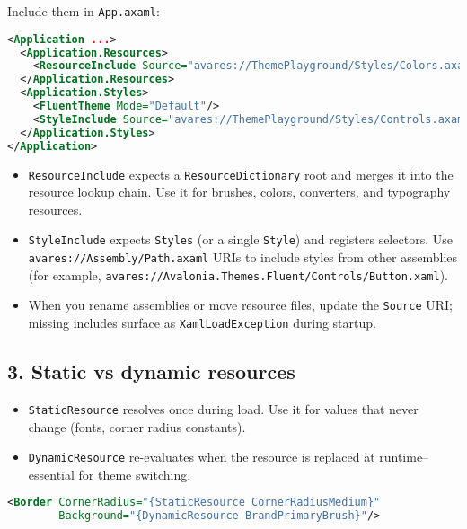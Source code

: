 Include them in \passthrough{\lstinline!App.axaml!}:

\begin{lstlisting}[language=XML]
<Application ...>
  <Application.Resources>
    <ResourceInclude Source="avares://ThemePlayground/Styles/Colors.axaml"/>
  </Application.Resources>
  <Application.Styles>
    <FluentTheme Mode="Default"/>
    <StyleInclude Source="avares://ThemePlayground/Styles/Controls.axaml"/>
  </Application.Styles>
</Application>
\end{lstlisting}

\begin{itemize}
\tightlist
\item
  \passthrough{\lstinline!ResourceInclude!} expects a
  \passthrough{\lstinline!ResourceDictionary!} root and merges it into
  the resource lookup chain. Use it for brushes, colors, converters, and
  typography resources.
\item
  \passthrough{\lstinline!StyleInclude!} expects
  \passthrough{\lstinline!Styles!} (or a single
  \passthrough{\lstinline!Style!}) and registers selectors. Use
  \passthrough{\lstinline!avares://Assembly/Path.axaml!} URIs to include
  styles from other assemblies (for example,
  \passthrough{\lstinline!avares://Avalonia.Themes.Fluent/Controls/Button.xaml!}).
\item
  When you rename assemblies or move resource files, update the
  \passthrough{\lstinline!Source!} URI; missing includes surface as
  \passthrough{\lstinline!XamlLoadException!} during startup.
\end{itemize}

\subsection{3. Static vs dynamic
resources}\label{static-vs-dynamic-resources}

\begin{itemize}
\tightlist
\item
  \passthrough{\lstinline!StaticResource!} resolves once during load.
  Use it for values that never change (fonts, corner radius constants).
\item
  \passthrough{\lstinline!DynamicResource!} re-evaluates when the
  resource is replaced at runtime--essential for theme switching.
\end{itemize}

\begin{lstlisting}[language=XML]
<Border CornerRadius="{StaticResource CornerRadiusMedium}"
        Background="{DynamicResource BrandPrimaryBrush}"/>
\end{lstlisting}

